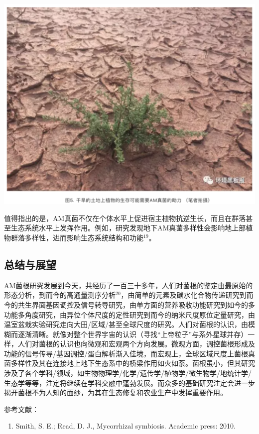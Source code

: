 \documentclass[]{book}
\providecommand{\tightlist}{%
  \setlength{\itemsep}{0pt}\setlength{\parskip}{0pt}}
\begin{document}
\includegraphics[width=6.67in]{images/am5}

值得指出的是，AM真菌不仅在个体水平上促进宿主植物抗逆生长，而且在群落甚至生态系统水平上发挥作用。例如，研究发现地下AM真菌多样性会影响地上部植物群落多样性，进而影响生态系统结构和功能\(^{19}\)。

\hypertarget{ux603bux7ed3ux4e0eux5c55ux671b}{%
\subsection{总结与展望}\label{ux603bux7ed3ux4e0eux5c55ux671b}}

AM菌根研究发展到今天，共经历了一百三十多年，人们对菌根的鉴定由最原始的形态分析，到而今的高通量测序分析\(^{20}\)，由简单的元素及碳水化合物传递研究到而今的共生界面基因调控及信号转导研究，由单方面的营养吸收功能研究到如今的多功能多角度研究，由异位个体尺度的定性研究到而今的纳米尺度原位定量研究，由温室盆栽实验研究走向大田/区域/甚至全球尺度的研究。人们对菌根的认识，由模糊而逐渐清晰。就像对整个世界宇宙的认识（寻找``上帝粒子''与系外星球并存）一样，人们对菌根的认识也向微观和宏观两个方向发展。微观方面，调控菌根形成及功能的信号传导/基因调控/蛋白解析渐入佳境，而宏观上，全球区域尺度上菌根真菌多样性及其在连接地上地下生态系中的桥梁作用如火如荼。菌根虽小，但其研究涉及了各个学科/领域，如生物物理学/化学/遗传学/植物学/微生物学/地统计学/生态学等等，注定将继续在学科交融中蓬勃发展。而众多的基础研究注定会进一步揭开菌根不为人知的面纱，为其在生态修复和农业生产中发挥重要作用。

参考文献：

\begin{enumerate}
\def\labelenumi{\arabic{enumi}.}
\tightlist
\item
  Smith, S. E.; Read, D. J., Mycorrhizal symbiosis. Academic press: 2010.
\end{enumerate}
\end{document}
